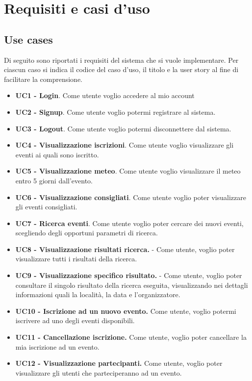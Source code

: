 \section{Requisiti e casi d'uso}

\subsection{Use cases}
Di seguito sono riportati i requisiti del sistema che si vuole implementare. Per ciascun caso si indica
il codice del caso d'uso, il titolo e la user story al fine di facilitare la comprensione.

\begin{itemize}
    \item \textbf{UC1 - Login}. Come utente voglio accedere al mio account
    \item \textbf{UC2 - Signup}. Come utente voglio potermi registrare al sistema.
    \item \textbf{UC3 - Logout}. Come utente voglio potermi disconnettere dal sistema.
    \item \textbf{UC4 - Visualizzazione iscrizioni}. Come utente voglio visualizzare gli eventi ai quali sono iscritto.
    \item \textbf{UC5 - Visualizzazione meteo}. Come utente voglio visualizzare il meteo entro 5 giorni dall’evento.
    \item \textbf{UC6 - Visualizzazione consigliati}. Come utente voglio poter visualizzare gli eventi consigliati.
    \item \textbf{UC7 - Ricerca eventi}. Come utente voglio poter cercare dei nuovi eventi, scegliendo degli opportuni parametri di ricerca.
    \item \textbf{UC8 - Visualizzazione risultati ricerca.} - Come utente, voglio poter visualizzare tutti i risultati della ricerca.
    \item \textbf{UC9 - Visualizzazione specifico risultato.} - Come utente, voglio poter consultare il singolo risultato della ricerca eseguita, visualizzando nei dettagli informazioni quali la località, la data e l’organizzatore.
    \item \textbf{UC10 - Iscrizione ad un nuovo evento.} Come utente, voglio potermi iscrivere ad uno degli eventi disponibili.
    \item \textbf{UC11 - Cancellazione iscrizione.} Come utente, voglio poter cancellare la mia iscrizione ad un evento.
    \item \textbf{UC12 - Visualizzazione partecipanti.} Come utente, voglio poter visualizzare gli utenti che parteciperanno ad un evento.

\end{itemize}
